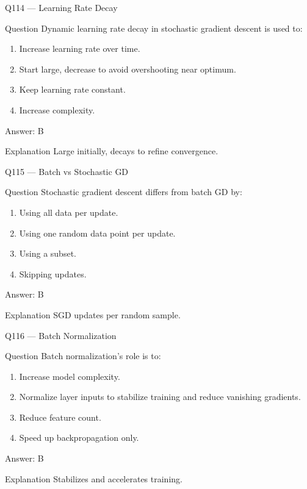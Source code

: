 \documentclass[aspectratio=169,8pt]{beamer}
\begin{document}
	\begin{frame}{Q114 --- Learning Rate Decay}
		\begin{block}{Question}
			Dynamic learning rate decay in stochastic gradient descent is used to:
		\end{block}
		\begin{enumerate}
			\item Increase learning rate over time.
			\item Start large, decrease to avoid overshooting near optimum.
			\item Keep learning rate constant.
			\item Increase complexity.
		\end{enumerate}

	\begin{exampleblock}{Answer: B}\end{exampleblock}
	\begin{block}{Explanation}
		Large initially, decays to refine convergence.
	\end{block}
\end{frame}

\begin{frame}{Q115 --- Batch vs Stochastic GD}
	\begin{block}{Question}
		Stochastic gradient descent differs from batch GD by:

	\begin{enumerate}
		\item Using all data per update.
		\item Using one random data point per update.
		\item Using a subset.
		\item Skipping updates.
	\end{enumerate}
\end{block}
\begin{exampleblock}{Answer: B}\end{exampleblock}
\begin{block}{Explanation}
	SGD updates per random sample.
\end{block}
\end{frame}

\begin{frame}{Q116 --- Batch Normalization}
\begin{block}{Question}
	Batch normalization's role is to:
\end{block}
\begin{enumerate}
	\item Increase model complexity.
	\item Normalize layer inputs to stabilize training and reduce vanishing gradients.
	\item Reduce feature count.
	\item Speed up backpropagation only.
\end{enumerate}

\begin{exampleblock}{Answer: B}\end{exampleblock}
\begin{block}{Explanation}
Stabilizes and accelerates training.
\end{block}
\end{frame}
\end{document}
